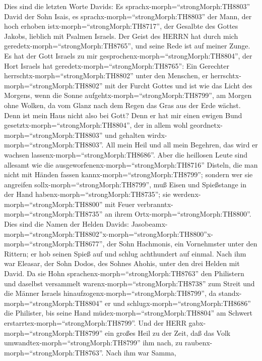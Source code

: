  Dies sind die letzten Worte Davids: Es
sprachx-morph=``strongMorph:TH8803'' David der Sohn Isais, es
sprachx-morph=``strongMorph:TH8803'' der Mann, der hoch erhoben
istx-morph=``strongMorph:TH8717'', der Gesalbte des Gottes Jakobs,
lieblich mit Psalmen Israels.  Der Geist des HERRN hat durch
mich geredetx-morph=``strongMorph:TH8765'', und seine Rede ist auf
meiner Zunge.  Es hat der Gott Israels zu mir
gesprochenx-morph=``strongMorph:TH8804'', der Hort Israels hat
geredetx-morph=``strongMorph:TH8765'': Ein Gerechter
herrschtx-morph=``strongMorph:TH8802'' unter den Menschen, er
herrschtx-morph=``strongMorph:TH8802'' mit der Furcht Gottes
 und ist wie das Licht des Morgens, wenn die Sonne
aufgehtx-morph=``strongMorph:TH8799'', am Morgen ohne Wolken, da vom
Glanz nach dem Regen das Gras aus der Erde wächst.  Denn ist
mein Haus nicht also bei Gott? Denn er hat mir einen ewigen Bund
gesetztx-morph=``strongMorph:TH8804'', der in allem wohl
geordnetx-morph=``strongMorph:TH8803'' und gehalten
wirdx-morph=``strongMorph:TH8803''. All mein Heil und all mein Begehren,
das wird er wachsen lassenx-morph=``strongMorph:TH8686''. 
Aber die heillosen Leute sind allesamt wie die
ausgeworfenenx-morph=``strongMorph:TH8716'' Disteln, die man nicht mit
Händen fassen kannx-morph=``strongMorph:TH8799'';  sondern
wer sie angreifen sollx-morph=``strongMorph:TH8799'', muß Eisen und
Spießstange in der Hand habenx-morph=``strongMorph:TH8735''; sie
werdenx-morph=``strongMorph:TH8800'' mit Feuer
verbranntx-morph=``strongMorph:TH8735'' an ihrem
Ortx-morph=``strongMorph:TH8800''.  Dies sind die Namen der
Helden Davids:
Jasobeamx-morph=``strongMorph:TH8802''x-morph=``strongMorph:TH8800''\textbar x-morph=``strongMorph:TH8677'',
der Sohn Hachmonis, ein Vornehmster unter den Rittern; er hob seinen
Spieß auf und schlug achthundert auf einmal.  Nach ihm war
Eleasar, der Sohn Dodos, des Sohnes Ahohis, unter den drei Helden mit
David. Da sie Hohn sprachenx-morph=``strongMorph:TH8763'' den Philistern
und daselbst versammelt warenx-morph=``strongMorph:TH8738'' zum Streit
und die Männer Israels hinaufzogenx-morph=``strongMorph:TH8799'',
 da standx-morph=``strongMorph:TH8804'' er und
schlugx-morph=``strongMorph:TH8686'' die Philister, bis seine Hand
müdex-morph=``strongMorph:TH8804'' am Schwert
erstarrtex-morph=``strongMorph:TH8799''. Und der HERR
gabx-morph=``strongMorph:TH8799'' ein großes Heil zu der Zeit, daß das
Volk umwandtex-morph=``strongMorph:TH8799'' ihm nach, zu
raubenx-morph=``strongMorph:TH8763''.  Nach ihm war Samma,
